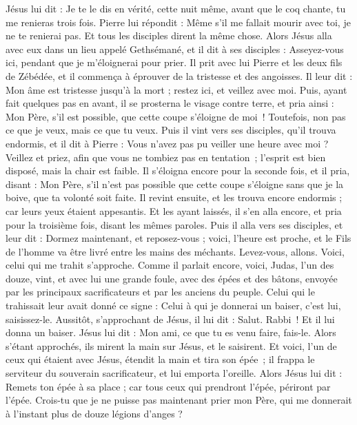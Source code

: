 \begin{multicols}{2}
{Jésus lui dit : Je te le dis en vérité, cette nuit même, avant que le coq chante, tu me renieras trois fois.
Pierre lui répondit : Même s’il me fallait mourir avec toi, je ne te renierai pas. Et tous les disciples dirent la même chose.
Alors Jésus alla avec eux dans un lieu appelé Gethsémané, et il dit à ses disciples : Asseyez-vous ici, pendant que je m’éloignerai pour prier.
Il prit avec lui Pierre et les deux fils de Zébédée, et il commença à éprouver de la tristesse et des angoisses.
Il leur dit : Mon âme est tristesse jusqu’à la mort ; restez ici, et veillez avec moi.
Puis, ayant fait quelques pas en avant, il se prosterna le visage contre terre, et pria ainsi : Mon Père, s'il est possible, que cette coupe s’éloigne de moi ! Toutefois, non pas ce que je veux, mais ce que tu veux.
Puis il vint vers ses disciples, qu’il trouva endormis, et il dit à Pierre : Vous n’avez pas pu veiller une heure avec moi ?
Veillez et priez, afin que vous ne tombiez pas en tentation ; l'esprit est bien disposé, mais la chair est faible.
Il s’éloigna encore pour la seconde fois, et il pria, disant : Mon Père, s'il n'est pas possible que cette coupe s’éloigne sans que je la boive, que ta volonté soit faite.
Il revint ensuite, et les trouva encore endormis ; car leurs yeux étaient appesantis.
Et les ayant laissés, il s'en alla encore, et pria pour la troisième fois, disant les mêmes paroles.
Puis il alla vers ses disciples, et leur dit : Dormez maintenant, et reposez-vous ; voici, l'heure est proche, et le Fils de l'homme va être livré entre les mains des méchants.
Levez-vous, allons. Voici, celui qui me trahit s'approche.
Comme il parlait encore, voici, Judas, l'un des douze, vint, et avec lui une grande foule, avec des épées et des bâtons, envoyée par les principaux sacrificateurs et par les anciens du peuple.
Celui qui le trahissait leur avait donné ce signe : Celui à qui je donnerai un baiser, c'est lui, saisissez-le.
Aussitôt, s'approchant de Jésus, il lui dit : Salut. Rabbi ! Et il lui donna un baiser.
Jésus lui dit : Mon ami, ce que tu es venu faire, fais-le. Alors s'étant approchés, ils mirent la main sur Jésus, et le saisirent.
Et voici, l'un de ceux qui étaient avec Jésus, étendit la main et tira son épée ; il frappa le serviteur du souverain sacrificateur, et lui emporta l'oreille.
Alors Jésus lui dit : Remets ton épée à sa place ; car tous ceux qui prendront l'épée, périront par l'épée.
Crois-tu que je ne puisse pas maintenant prier mon Père, qui me donnerait à l’instant plus de douze légions d'anges ?
}
\end{multicols}
